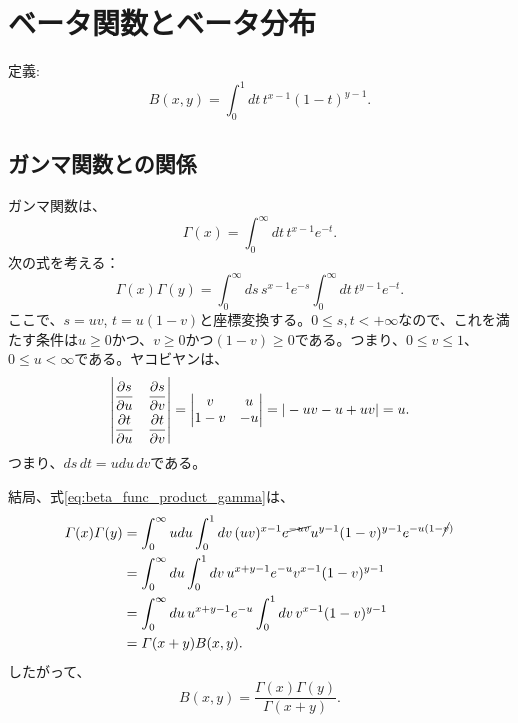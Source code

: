 \section{ベータ関数とベータ分布}
定義:
\begin{equation}
 B(x,y)=\int_0^1dt\,t^{x-1}(1-t)^{y-1}.
\end{equation}

\subsection{ガンマ関数との関係}
ガンマ関数は、
\begin{equation}
 \Gamma(x)=\int_0^\infty dt\, t^{x-1}e^{-t}.
\end{equation}
次の式を考える：
\begin{equation}
 \Gamma(x)\Gamma(y)=\int_0^\infty ds\,s^{x-1}e^{-s}\int_0^\infty dt\, t^{y-1}e^{-t}.\label{eq:beta_func_product_gamma}
\end{equation}
ここで、$s=uv$, $t=u(1-v)$と座標変換する。$0\le s, t< +\infty$なので、これを満たす条件は$u\ge 0$かつ、$v\ge 0$かつ$(1-v)\ge 0$である。つまり、$0\le v \le 1$、$0\le u < \infty$である。ヤコビヤンは、
\begin{equation}
\renewcommand{\arraystretch}{2} %
 \begin{vmatrix}
  \dfrac{\partial s}{\partial u} & \dfrac{\partial s}{\partial v} \\
  \dfrac{\partial t}{\partial u} & \dfrac{\partial t}{\partial v}
 \end{vmatrix}
\renewcommand{\arraystretch}{1} %
=
\begin{vmatrix}
 v & u\\
1-v & -u
\end{vmatrix}
=|-uv-u+uv|=u.
\end{equation}
つまり、$ds\,dt=udu\,dv$である。

結局、式\eqref{eq:beta_func_product_gamma}は、
\begin{align*}
 \Gamma(x)\Gamma(y)&=\int_0^\infty udu\int_0^1dv\,(uv)^{x-1}e^{\cancel{-uv}}u^{y-1}(1-v)^{y-1}e^{-u(1-\cancel{v})}\\
&= \int_0^\infty du\int_0^1dv\, u^{x+y-1}e^{-u}v^{x-1}(1-v)^{y-1}\\
&=\int_0^\infty du\, u^{x+y-1}e^{-u}\int_0^1dv\, v^{x-1}(1-v)^{y-1}\\
&=\Gamma(x+y)B(x, y).
\end{align*}
したがって、
\begin{equation}
 B(x,y)=\dfrac{\Gamma(x)\Gamma(y)}{\Gamma(x+y)}.
\end{equation}

